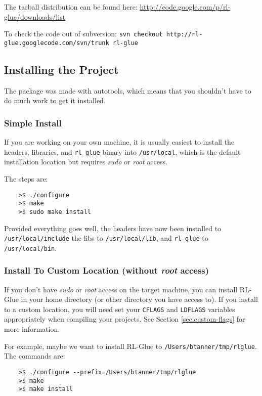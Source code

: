 \documentclass[11pt]{article}
\begin{document}
The tarball distribution can be found here:\newline
\url{http://code.google.com/p/rl-glue/downloads/list}


To check the code out of subversion:\newline
\texttt{svn checkout http://rl-glue.googlecode.com/svn/trunk rl-glue}

\subsection{Installing the Project}
The package was made with autotools, which means that you shouldn't have to do much work to get it installed.  

\subsubsection{Simple Install}
If you are working on your own machine, it is usually easiest to install the headers, libraries, and \texttt{rl\_glue} binary into \texttt{/usr/local}, which is the default 
installation location but requires \textit{sudo} or \textit{root} access.

The steps are:
\begin{verbatim}
	>$ ./configure
	>$ make
	>$ sudo make install
\end{verbatim}

Provided everything goes well, the headers have now been installed to \texttt{/usr/local/include} the libs to \texttt{/usr/local/lib}, and \texttt{rl\_glue} to \texttt{/usr/local/bin}.

\subsubsection{Install  To Custom Location (without \textit{root} access)}
If you don't have \textit{sudo} or \textit{root} access on the target machine, you can install RL-Glue in your home directory (or other directory you have access to).
If you install to a custom location, you will need set your \texttt{CFLAGS} and \texttt{LDFLAGS} variables appropriately when compiling your projects. See Section \ref{sec:custom-flags} for more information.

For example, maybe we want to install RL-Glue to \texttt{/Users/btanner/tmp/rlglue}.  The commands are:
\begin{verbatim}
	>$ ./configure --prefix=/Users/btanner/tmp/rlglue
	>$ make
	>$ make install
\end{verbatim}
\end{document}
